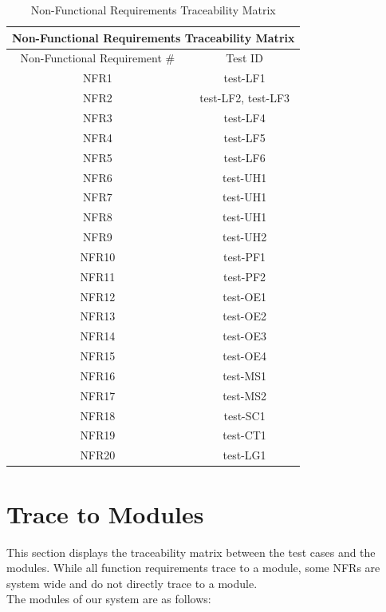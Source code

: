 \documentclass[12pt, titlepage]{article}
\begin{document}
\begin{table}[H]
    \centering
    \begin{tabular}{|c|c|}
\hline
\multicolumn{2}{|c|}{Non-Functional Requirements Traceability Matrix} \\ \hline
Non-Functional Requirement \# & Test ID \\ \hline
NFR1 & test-LF1 \\ \hline
NFR2 & test-LF2, test-LF3 \\ \hline
NFR3 & test-LF4 \\ \hline
NFR4 & test-LF5 \\ \hline
NFR5 & test-LF6 \\ \hline
NFR6 & test-UH1 \\ \hline
NFR7 & test-UH1 \\ \hline
NFR8 & test-UH1 \\ \hline
NFR9 & test-UH2 \\ \hline
NFR10 & test-PF1 \\ \hline
NFR11 & test-PF2 \\ \hline
NFR12 & test-OE1 \\ \hline
NFR13 & test-OE2 \\ \hline
NFR14 & test-OE3 \\ \hline
NFR15 & test-OE4 \\ \hline
NFR16 & test-MS1 \\ \hline
NFR17 & test-MS2 \\ \hline
NFR18 & test-SC1 \\ \hline
NFR19 & test-CT1 \\ \hline
NFR20 & test-LG1 \\ \hline
\end{tabular}
    \caption{Non-Functional Requirements Traceability Matrix}
    \label{tab:nfrtrace}
\end{table}




\newpage
\section{Trace to Modules}

This section displays the traceability matrix between the test cases and the modules. While all function requirements trace to a module, some NFRs are system wide and do not directly trace to a module. \\

The modules of our system are as follows: \\
\end{document}
